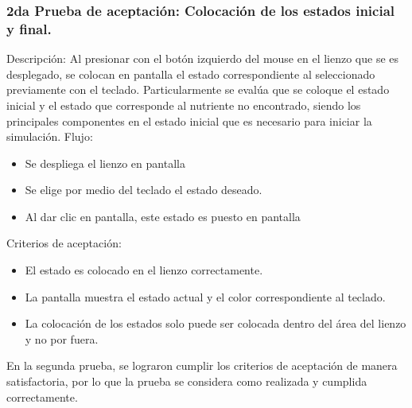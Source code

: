 \subsubsection{2da Prueba de aceptaci\'on: Colocaci\'on de los estados inicial y final.}
    Descripci\'on: Al presionar con el bot\'on izquierdo del mouse
        en el lienzo que se es desplegado, se colocan en pantalla el
        estado correspondiente al seleccionado previamente con el
        teclado. Particularmente se eval\'ua que se coloque el estado
        inicial y el estado que corresponde al nutriente no
        encontrado, siendo los principales componentes en el estado
        inicial que es necesario para iniciar la simulaci\'on.
    \vskip 0.5cm
    Flujo:
    \vskip 0.5cm
    \begin{itemize}
        \item Se despliega el lienzo en pantalla
        \item Se elige por medio del teclado el estado deseado.
        \item Al dar clic en pantalla, este estado es puesto en pantalla
    \end{itemize}
    \vskip 0.5cm
    Criterios de aceptaci\'on:
    \begin{itemize}
        \item El estado es colocado en el lienzo correctamente.
        \item La pantalla muestra el estado actual y el color
            correspondiente al teclado.
        \item La colocaci\'on de los estados solo puede ser colocada
            dentro del \'area del lienzo y no por fuera.
    \end{itemize}
    \vskip 0.5cm
        En la segunda prueba, se lograron cumplir los criterios de aceptaci\'on de manera satisfactoria, por lo que la prueba se
        considera como realizada y cumplida correctamente.
